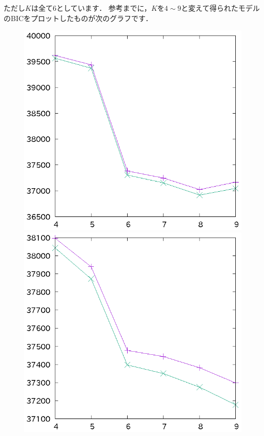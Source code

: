 ﻿\documentclass{jsarticle}
\begin{document}
ただし$K$は全て6としています．
参考までに，$K$を$4\sim 9$と変えて得られたモデルのBICをプロットしたものが次のグラフです．
\begin{figure}[h]
\begin{center}
 \begin{minipage}{.32\textwidth}
 \begin{center}
 \includegraphics[height=.18\textheight]{fig/gmm2_bic.eps}
 \end{center}
 \end{minipage}
 \begin{minipage}{.32\textwidth}
 \begin{center}
 \includegraphics[height=.18\textheight]{fig/gmm1_bic.eps}

\end{center}
\end{minipage}
\end{center}
\end{figure}
\end{document}

